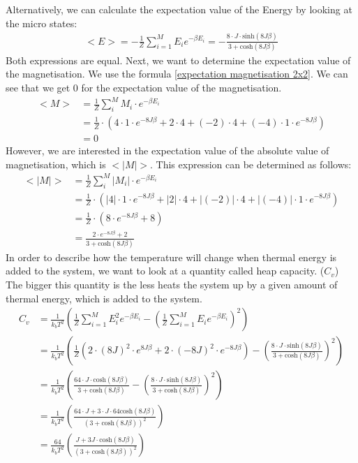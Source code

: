 \documentclass[10pt,a4paper]{article}
\begin{document}
Alternatively, we can calculate the expectation value of the Energy by looking at the micro states:
\begin{align}
<E> =- \frac{1}{Z} \sum_{i=1}^{M} E_i e^{- \beta E_i}=-\frac{8 \cdot J \cdot  \mathrm{sinh}(8J \beta ) }{3+\mathrm{cosh}(8J\beta)}
\end{align}
Both expressions are equal. Next, we want to determine the expectation value of the magnetisation. We use the formula \ref{expectation magnetisation 2x2}. We can see that we get 0 for the expectation value of the magnetisation. 
\begin{align}
<M> &= \frac{1}{Z} \sum_{i}^M M_i \cdot e^{- \beta E_i }\\\label{expectation magnetisation 2x2}
&= \frac{1}{Z} \cdot \left( 4 \cdot 1 \cdot e^{-8J\beta}+ 2 \cdot 4+(-2) \cdot 4 + (-4) \cdot 1 \cdot e^{-8J \beta } \right)\\
&=0
\end{align}
However, we are interested in the expectation value of the absolute value of magnetisation, which is $<|M|>$. This expression can be determined as follows:
\begin{align}
<|M|> &= \frac{1}{Z} \sum_{i}^M |M_i| \cdot e^{- \beta E_i }\\\label{expectation absolute magnetisation 2x2}
&= \frac{1}{Z} \cdot \left( |4| \cdot 1 \cdot e^{-8J\beta}+ |2| \cdot 4+|(-2)| \cdot 4 + |(-4)| \cdot 1 \cdot e^{-8J \beta } \right)\\
&=\frac{1}{Z} \cdot \left( 8 \cdot e^{-8J\beta} +8 \right)\\
&= \frac{2 \cdot e^{-8J\beta}+2}{3+ \mathrm{cosh}(8J\beta)}
\end{align}
In order to describe how the temperature will change when thermal energy is added to the system, we want to look at a quantity called heap capacity. ($C_v$) The bigger this quantity is the less heats the system up by a given amount of thermal energy, which is added to the system.  
\begin{align}
C_v &= \frac{1}{k_b T^2} \left( \frac{1}{Z} \sum_{i=1}^{M} E_i^2 e^{- \beta E_i } - \left( \frac{1}{Z} \sum_{i=1}^{M} E_i e^{- \beta E_i }  \right)^2 \right)\\
&=\frac{1}{k_b T^2} \left( \frac{1}{Z} \left( 2 \cdot (8J)^2 \cdot e^{8J \beta}+2 \cdot (-8J)^2 \cdot e^{-8J \beta} \right) - \left( \frac{8 \cdot J \cdot  \mathrm{sinh}(8J \beta ) }{3+\mathrm{cosh}(8J\beta)} \right)^2 \right)\\
&=\frac{1}{k_b T^2} \left( \frac{64\cdot J\cdot \mathrm{cosh}(8 J \beta )}{3+\mathrm{cosh}(8J\beta)}  - \left( \frac{8 \cdot J \cdot \mathrm{sinh}(8J \beta ) }{3+\mathrm{cosh}(8J\beta)} \right)^2 \right)\\
&= \frac{1}{k_b T^2} \left( \frac{64 \cdot J +3\cdot J \cdot 64 \mathrm{cosh}(8J \beta)}{\left(3+\mathrm{cosh}(8J\beta)\right)^2} \right)\\
&= \frac{64}{k_b T^2} \left( \frac{ J +3 J \cdot \mathrm{cosh}(8J \beta)}{\left(3+\mathrm{cosh}(8J\beta)\right)^2} \right)\\
\end{align}
\end{document}
